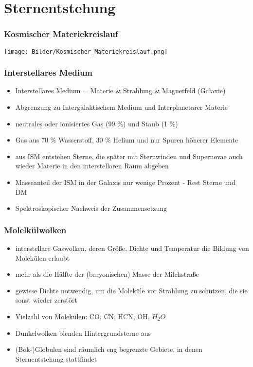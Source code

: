 \documentclass{beamer}
\begin{document}
\section{Sternentstehung}

\begin{frame}\frametitle{Kosmischer Materiekreislauf}

\texttt{[image: Bilder/Kosmischer\_Materiekreislauf.png]}

\end{frame}

\begin{frame}\frametitle{Interstellares Medium}

\small

\begin{itemize}
\item Interstellares Medium = Materie \& Strahlung \& Magnetfeld (Galaxie)
\item Abgrenzung zu Intergalaktischem Medium und Interplanetarer Materie
\item neutrales oder ionisiertes Gas (99 \%) und Staub (1 \%)
\item Gas aus 70 \% Wasserstoff, 30 \% Helium und nur Spuren höherer Elemente
\item aus ISM entstehen Sterne, die später mit Sternwinden und Supernovae auch wieder Materie in den interstellaren Raum abgeben
\item Masseanteil der ISM in der Galaxis nur wenige Prozent - Rest Sterne und DM
\item Spektroskopischer Nachweis der Zusammensetzung
\end{itemize}

\end{frame}

\begin{frame}\frametitle{Molelkülwolken}

\begin{itemize}
\item interstellare Gaswolken, deren Größe, Dichte und Temperatur die Bildung von Molekülen erlaubt
\item mehr als die Hälfte der (baryonischen) Masse der Milchstraße
\item gewisse Dichte notwendig, um die Moleküle vor Strahlung zu schützen, die sie sonst wieder zerstört
\item Vielzahl von Molekülen: CO, CN, HCN, OH, $H_2O$
\item Dunkelwolken blenden Hintergrundsterne aus
\item (Bok-)Globulen sind räumlich eng begrenzte Gebiete, in denen Sternentstehung stattfindet
\end{itemize}

\end{frame}
\end{document}
